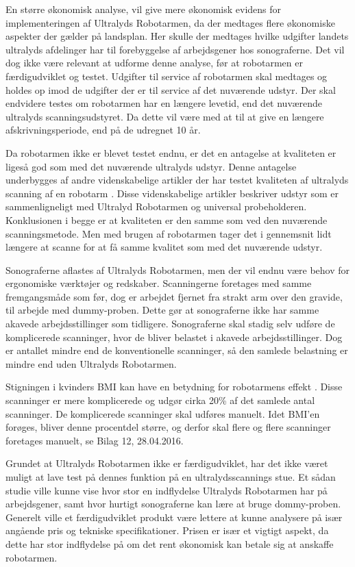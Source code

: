 En større økonomisk analyse, vil give mere økonomisk evidens for implementeringen af Ultralyds Robotarmen, da der medtages flere økonomiske aspekter der gælder på landsplan. Her skulle der medtages hvilke udgifter landets ultralyds afdelinger har til forebyggelse af arbejdsgener hos sonograferne. Det vil dog ikke være relevant at udforme denne analyse, før at robotarmen er færdigudviklet og testet. Udgifter til service af robotarmen skal medtages og holdes op imod de udgifter der er til service af det nuværende udstyr. Der skal endvidere testes om robotarmen har en længere levetid, end det nuværende ultralyds scanningsudstyret. Da dette vil være med at til at give en længere afskrivningsperiode, end på de udregnet 10 år. 

Da robotarmen ikke er blevet testet endnu, er det en antagelse at kvaliteten er ligeså god som med det nuværende ultralyds udstyr. Denne antagelse underbygges af andre videnskabelige artikler der har testet kvaliteten af ultralyds scanning af en robotarm \cite{8} \cite{18}. Disse videnskabelige artikler beskriver udstyr som er sammenligneligt med Ultralyd Robotarmen og universal probeholderen. Konklusionen i begge er at kvaliteten er den samme som ved den nuværende scanningsmetode. Men med brugen af robotarmen tager det i gennemsnit lidt længere at scanne for at få samme kvalitet som med det nuværende udstyr. 

Sonograferne aflastes af Ultralyds Robotarmen, men der vil endnu være behov for ergonomiske værktøjer og redskaber. Scanningerne foretages med samme fremgangsmåde som før, dog er arbejdet fjernet fra strakt arm over den gravide, til arbejde med dummy-proben. Dette gør at sonograferne ikke har samme akavede arbejdsstillinger som tidligere. Sonograferne skal stadig selv udføre de komplicerede scanninger, hvor de bliver belastet i akavede arbejdsstillinger. Dog er antallet mindre end de konventionelle scanninger, så den samlede belastning er mindre end uden Ultralyds Robotarmen. 

Stigningen i kvinders BMI kan have en betydning for robotarmens effekt \cite{kvinderovervaegt}. Disse scanninger er mere komplicerede og udgør cirka 20\% af det samlede antal scanninger. De komplicerede scanninger skal udføres manuelt. Idet BMI’en forøges, bliver denne procentdel større, og derfor skal flere og flere scanninger foretages manuelt, se Bilag 12, 28.04.2016. 

Grundet at Ultralyds Robotarmen ikke er færdigudviklet, har det ikke været muligt at lave test på dennes funktion på en ultralydsscannings stue. Et sådan studie ville kunne vise hvor stor en indflydelse Ultralyds Robotarmen har på arbejdsgener, samt hvor hurtigt sonograferne kan lære at bruge dommy-proben. \\ Generelt ville et færdigudviklet produkt være lettere at kunne analysere på især angående pris og tekniske specifikationer. Prisen er især et vigtigt aspekt, da dette har stor indflydelse på om det rent økonomisk kan betale sig at anskaffe robotarmen. 